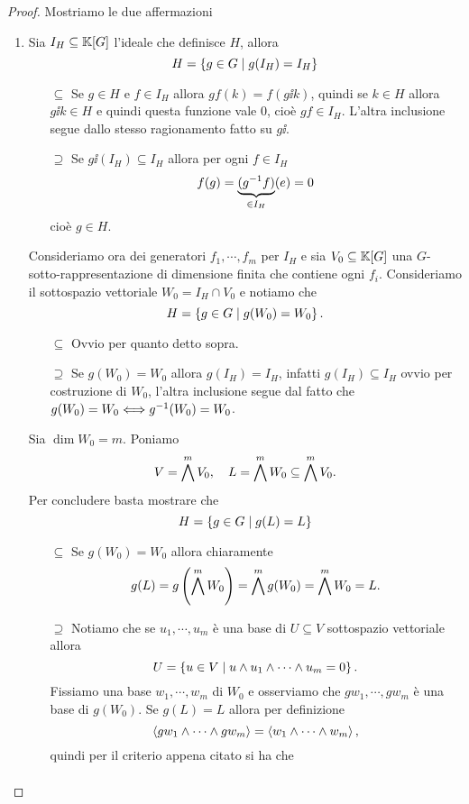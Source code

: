 \begin{proof}
Mostriamo le due affermazioni
\setlength{\leftmargini}{0cm}
\begin{enumerate}
\item Sia $I_H\subseteq \mathbb{K}[G]$ l'ideale che definisce $H$, allora
\[H=\left\{{g\in G\mid g(I_H)=I_H}\right\}\]
\setlength{\leftmargini}{0cm}
\begin{itemize}
\item[$\boxed{\subseteq}$] Se $g\in H$ e $f\in I_H$ allora $gf(k)=f(g\ii k)$, quindi se $k\in H$ allora $g\ii k\in H$ e quindi questa funzione vale $0$, cio\`e $gf\in I_H$. L'altra inclusione segue dallo stesso ragionamento fatto su $g\ii$.
\item[$\boxed{\supseteq}$] Se $g\ii(I_H)\subseteq I_H$ allora per ogni $f\in I_H$
\[f(g)=\underset{\in I_H}{\underbrace{(g^{-1} f)}}(e)=0\]
cio\`e $g\in H$.
\end{itemize}
\setlength{\leftmargini}{0.5cm}
Consideriamo ora dei generatori $f_1,\cdots, f_m$ per $I_H$ e sia $V_0\subseteq \mathbb{K}[G]$ una $G$-sotto-rappresentazione di dimensione finita che contiene ogni $f_i$. Consideriamo il sottospazio vettoriale $W_0=I_H\cap V_0$ e notiamo che
\[H=\left\{{g\in G\mid g(W_0)= W_0}\right\}.\]
\setlength{\leftmargini}{0cm}
\begin{itemize}
\item[$\boxed{\subseteq}$] Ovvio per quanto detto sopra.
\item[$\boxed{\supseteq}$] Se $g(W_0)= W_0$ allora $g(I_H)=I_H$, infatti $g(I_H)\subseteq I_H$ ovvio per costruzione di $W_0$, l'altra inclusione segue dal fatto che $g(W_0)=W_0\Longleftrightarrow g^{-1}(W_0)=W_0$.
\end{itemize}
\setlength{\leftmargini}{0.5cm}
Sia $\dim W_0=m$. Poniamo
\[V=\bigwedge^m V_0,\quad L=\bigwedge^m W_0\subseteq \bigwedge^m V_0.\]
Per concludere basta mostrare che
\[H=\left\{{g\in G\mid g(L)=L}\right\}\]
\setlength{\leftmargini}{0cm}
\begin{itemize}
\item[$\boxed{\subseteq}$] Se $g(W_0)=W_0$ allora chiaramente 
\[g(L)=g\left({\bigwedge^mW_0}\right)=\bigwedge^m g(W_0)=\bigwedge^m W_0=L.\] 
\item[$\boxed{\supseteq}$] Notiamo che se $u_1,\cdots, u_m$ \`e una base di $U\subseteq V$ sottospazio vettoriale allora 
\[U=\left\{{u\in V\mid u\wedge u_1\wedge\cdots\wedge u_m=0}\right\}.\]
Fissiamo una base $w_1,\cdots, w_m$ di $W_0$ e osserviamo che $g w_1,\cdots, gw_m$ \`e una base di $g(W_0)$. Se $g(L)=L$ allora per definizione
\[\left\langle {g w_1\wedge\cdots\wedge gw_m}\right\rangle=\left\langle {w_1\wedge\cdots\wedge w_m}\right\rangle,\] 
quindi per il criterio appena citato si ha che
\begin{align*}

\end{align*}
\end{itemize}
\end{enumerate}
\end{proof}
